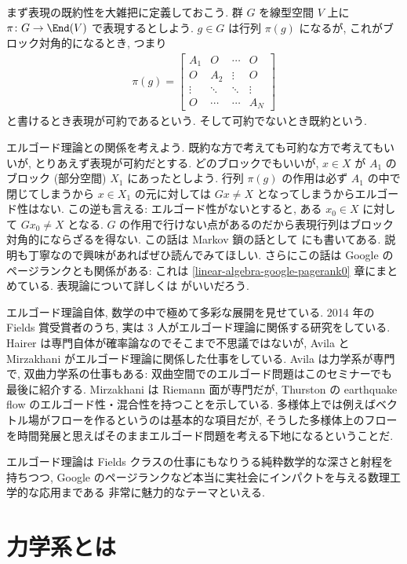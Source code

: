 \documentclass[openany, a4paper, oneside]{jsbook}
\begin{document}
まず表現の既約性を大雑把に定義しておこう.
群 $G$ を線型空間 $V$ 上に $\pi \colon G \to \End (V)$ で表現するとしよう.
$g \in G$ は行列 $\pi (g)$ になるが, これがブロック対角的になるとき, つまり
\begin{align}
 \pi (g)
 =
 \begin{bmatrix}
  A_1    & O      & \cdots  & O      \\
  O      & A_2    & \vdots  & O      \\
  \vdots & \ddots & \ddots  & \vdots \\
  O      & \cdots & \cdots  & A_N
 \end{bmatrix}
\end{align}
と書けるとき表現が可約であるという.
そして可約でないとき既約という.

エルゴード理論との関係を考えよう.
既約な方で考えても可約な方で考えてもいいが, とりあえず表現が可約だとする.
どのブロックでもいいが, $x \in X$ が $A_1$ のブロック (部分空間) $X_1$ にあったとしよう.
行列 $\pi (g)$ の作用は必ず $A_1$ の中で閉じてしまうから
$x \in X_1$ の元に対しては $Gx \neq X$ となってしまうからエルゴード性はない.
この逆も言える: エルゴード性がないとすると, ある $x_0 \in X$ に対して $G x_0 \neq X$ となる.
$G$ の作用で行けない点があるのだから表現行列はブロック対角的にならざるを得ない.
この話は Markov 鎖の話として \cite{TadahisaFunaki1} にも書いてある.
説明も丁寧なので興味があればぜひ読んでみてほしい.
さらにこの話は Google のページランクとも関係がある:
これは \ref{linear-algebra-google-pagerank0} 章にまとめている.
表現論について詳しくは \cite[2.2 (c)]{KobayashiOshima1} がいいだろう.

エルゴード理論自体, 数学の中で極めて多彩な展開を見せている.
2014 年の Fields 賞受賞者のうち, 実は 3 人がエルゴード理論に関係する研究をしている.
Hairer は専門自体が確率論なのでそこまで不思議ではないが,
Avila と Mirzakhani がエルゴード理論に関係した仕事をしている.
Avila は力学系が専門で, 双曲力学系の仕事もある: 双曲空間でのエルゴード問題はこのセミナーでも最後に紹介する.
Mirzakhani は Riemann 面が専門だが,
Thurston の earthquake flow のエルゴード性・混合性を持つことを示している.
多様体上では例えばベクトル場がフローを作るというのは基本的な項目だが,
そうした多様体上のフローを時間発展と思えばそのままエルゴード問題を考える下地になるということだ.

エルゴード理論は Fields クラスの仕事にもなりうる純粋数学的な深さと射程を持ちつつ,
Google のページランクなど本当に実社会にインパクトを与える数理工学的な応用まである
非常に魅力的なテーマといえる.
\section{力学系とは}
\end{document}
